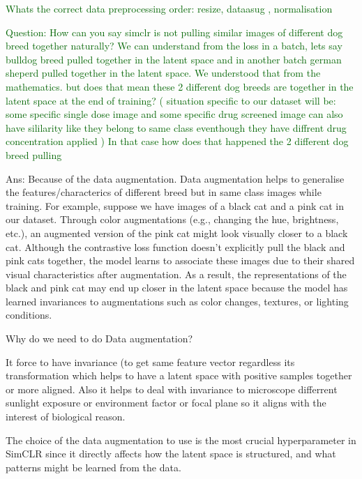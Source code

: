 \documentclass[12pt,twoside,a4paper,parskip]{scrbook} %
\begin{document}
\textcolor{darkgreen}{Whats the correct data preprocessing order: resize, dataasug , normalisation}


\textcolor{darkgreen}{Question: How can you say simclr is not pulling similar images of different dog breed together naturally? We can understand from the loss in a batch, lets say bulldog breed pulled together in the latent space and in another batch german sheperd pulled together in the latent space. We understood that from the mathematics. but does that mean these 2 different dog breeds are together in the latent space at the end of training? ( situation specific to our dataset will be: some specific single dose image and some specific drug screened image can also have sililarity like they belong to same class eventhough they have diffrent drug concentration applied ) In that case how does that happened the 2 different dog breed pulling}

Ans: Because of the data augmentation. Data augmentation helps to generalise the features/characterics of different breed but in same class images while training. For example, suppose we have images of a black cat and a pink cat in our dataset. Through color augmentations (e.g., changing the hue, brightness, etc.), an augmented version of the pink cat might look visually closer to a black cat. Although the contrastive loss function doesn’t explicitly pull the black and pink cats together, the model learns to associate these images due to their shared visual characteristics after augmentation. As a result, the representations of the black and pink cat may end up closer in the latent space because the model has learned invariances to augmentations such as color changes, textures, or lighting conditions.


Why do we need to do Data augmentation? 

It force to have invariance (to get same feature vector regardless its transformation which helps to have a latent space with positive samples together or more aligned. Also it helps to deal with invariance to microscope differrent sunlight exposure or environment factor or focal plane so it aligns with the interest of biological reason.

The choice of the data augmentation to use is the most crucial hyperparameter in SimCLR since it directly affects how the latent space is structured, and what patterns might be learned from the data.
\end{document}

